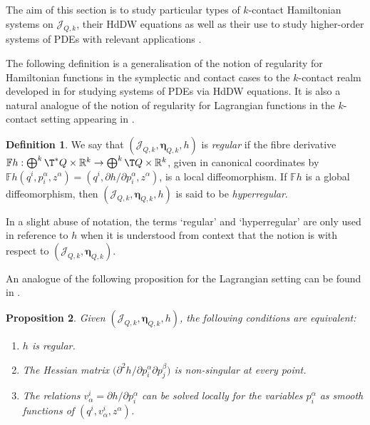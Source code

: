\documentclass[11pt,a4paper]{article}
\theoremstyle{plain} \newtheorem{theorem}{Theorem}[section] \newtheorem{proposition}[theorem]{Proposition} \newtheorem{corollary}[theorem]{Corollary} \newtheorem{lemma}[theorem]{Lemma} \theoremstyle{definition} \newtheorem{definition}[theorem]{Definition} \theoremstyle{remark} \newtheorem{remark}[theorem]{Remark} \newtheorem{example}[theorem]{Example} %
\begin{document}
The aim of this section is to study particular types of $k$-contact Hamiltonian systems on $\mathcal{J}_{Q,k}$, their HdDW equations as well as their use to study higher-order systems of PDEs with relevant applications \cite{Riv_22}.

The following definition is a generalisation of the notion of regularity for Hamiltonian functions in the symplectic and contact cases to the $k$-contact realm developed in \cite{deLucasLangeSardonRivas2026} for studying systems of PDEs via HdDW equations. It is also a natural analogue of the notion of regularity for Lagrangian functions in the $k$-contact setting appearing in \cite{Riv_22}.

\begin{definition}\label{def:regular_hamiltonian}
We say that \((\mathcal{J}_{Q,k},\bm \eta_{Q,k},h)\) is \emph{regular} if the fibre derivative \(\mathbb Fh:\bigoplus^k\T^*Q\times\mathbb R^k\to \bigoplus^k\T Q\times\mathbb R^k\), given in canonical coordinates by \(\mathbb Fh(q^i,p_i^\alpha,z^\alpha)=(q^i,\partial h/\partial p_i^\alpha,z^\alpha)\), is a local diffeomorphism. If \(\mathbb Fh\) is a global diffeomorphism, then \((\mathcal{J}_{Q,k},\bm \eta_{Q,k},h)\) is said to be \emph{hyperregular}.
\end{definition}

In a slight abuse of notation, the terms `regular' and `hyperregular' are only used in reference to $h$ when it is understood from context that the notion is with respect to $(\mathcal{J}_{Q,k},\bm\eta_{Q,k})$. 

An analogue of the following proposition for the Lagrangian setting can be found in \cite[Proposition 8.1.6]{Riv_22}.

\begin{proposition}\label{prop:equivalent_regular_hamiltonian}
Given \((\mathcal{J}_{Q,k},\bm\eta_{Q,k}, h)\), the following conditions are equivalent: 
\begin{enumerate}
\item \(h\) is regular.
\item The Hessian matrix \(\bigl(\partial^2 h/\partial p_i^\alpha\partial p_j^\beta\bigr)\) is non-singular at every point.
\item The relations \(v_\alpha^i=\partial h/\partial p_i^\alpha\) can be solved locally for the variables \(p_i^\alpha\) as smooth functions of \((q^i,v_\alpha^i,z^\alpha)\).
\end{enumerate}
\end{proposition}
\end{document}
